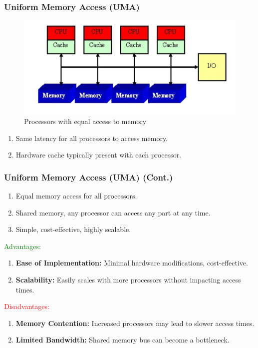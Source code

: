 \documentclass[
	12pt, %
]{beamer}
\begin{document}
\begin{frame}
	\frametitle{Uniform Memory Access (UMA)}
	
	\begin{figure}[h]
		\centering
		\includegraphics[width=0.8\linewidth]{Images/img1}
		\caption{Processors with equal access to memory}
		\label{Illustrates processors with equal access to memory.}
	\end{figure}
	
	\begin{enumerate}
		\item Same latency for all processors to access memory.
		\item Hardware cache typically present with each processor.
	\end{enumerate}	
\end{frame}





\begin{frame}
	\frametitle{Uniform Memory Access (UMA) (Cont.)}
	
	\begin{enumerate}
		\item Equal memory access for all processors.
		\item Shared memory, any processor can access any part at any time.
		\item Simple, cost-effective, highly scalable.
	\end{enumerate}
	
	\textcolor{green}{Advantages:}
	\begin{enumerate}
		\item \textbf{Ease of Implementation:} Minimal hardware modifications, cost-effective.
		\item \textbf{Scalability:} Easily scales with more processors without impacting access times.
	\end{enumerate}
	
	\textcolor{red}{Disadvantages:}
	\begin{enumerate}
		\item \textbf{Memory Contention:} Increased processors may lead to slower access times.
		\item \textbf{Limited Bandwidth:} Shared memory bus can become a bottleneck.
	\end{enumerate}


\end{frame}
\end{document}
